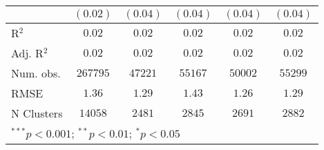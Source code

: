 \begin{table}[!htbp]
\begin{center}
\begin{tabular}{l c c c c c}
                                & $(0.02)$      & $(0.04)$      & $(0.04)$      & $(0.04)$      & $(0.04)$      \\
\hline
R$^2$                           & $0.02$        & $0.02$        & $0.02$        & $0.02$        & $0.02$        \\
Adj. R$^2$                      & $0.02$        & $0.02$        & $0.02$        & $0.02$        & $0.02$        \\
Num. obs.                       & $267795$      & $47221$       & $55167$       & $50002$       & $55299$       \\
RMSE                            & $1.36$        & $1.29$        & $1.43$        & $1.26$        & $1.29$        \\
N Clusters                      & $14058$       & $2481$        & $2845$        & $2691$        & $2882$        \\
\hline
\multicolumn{6}{l}{\scriptsize{$^{***}p<0.001$; $^{**}p<0.01$; $^{*}p<0.05$}}
\end{tabular}
\label{table:coefficients}
\end{center}
\end{table}
